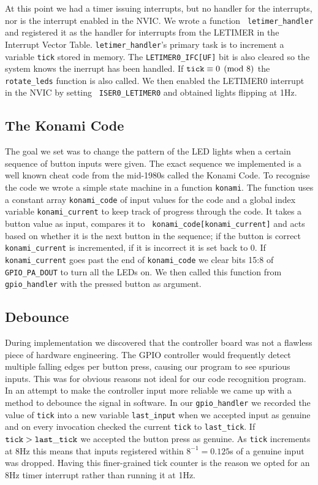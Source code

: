At this point we had a timer issuing interrupts, but no handler for the
interrupts, nor is the interrupt enabled in the NVIC. We wrote a function {\tt
letimer\_handler} and registered it as the handler for interrupts from the
LETIMER in the Interrupt Vector Table. {\tt letimer\_handler}'s primary task is
to increment a variable {\tt tick} stored in memory. The {\tt LETIMER0\_IFC[UF]}
bit is also cleared so the system knows the inerrupt has been handled. If \(
{\tt tick} \equiv 0 \pmod 8 \) the {\tt rotate\_leds} function is also called.
We then enabled the LETIMER0 interrupt in the NVIC by setting {\tt
ISER0\_LETIMER0} and obtained lights flipping at 1Hz.

\subsection{The Konami Code}

The goal we set was to change the pattern of the LED lights when a certain
sequence of button inputs were given. The exact sequence we implemented is a
well known cheat code from the mid-1980s called the Konami Code. To recognise
the code we wrote a simple state machine in a function {\tt konami}. The
function uses a constant array {\tt konami\_code} of input values for the code
and a global index variable {\tt konami\_current} to keep track of progress
through the code. It takes a button value as input, compares it to {\tt
konami\_code[konami\_current]} and acts based on whether it is the next button
in the sequence; if the button is correct {\tt konami\_current} is incremented,
if it is incorrect it is set back to 0. If {\tt konami\_current} goes past the
end of {\tt konami\_code} we clear bits 15:8 of {\tt GPIO\_PA\_DOUT} to turn all
the LEDs on. We then called this function from {\tt gpio\_handler} with the
pressed button as argument.

\subsection{Debounce}

During implementation we discovered that the controller board was not a flawless
piece of hardware engineering. The GPIO controller would frequently detect
multiple falling edges per button press, causing our program to see spurious
inputs. This was for obvious reasons not ideal for our code recognition program.
In an attempt to make the controller input more reliable we came up with a
method to debounce the signal in software. In our {\tt gpio\_handler} we
recorded the value of {\tt tick} into a new variable {\tt last\_input} when we
accepted input as genuine and on every invocation checked the current {\tt tick}
to {\tt last\_tick}. If \({\tt tick} > {\tt last\_tick}\) we accepted the button
press as genuine. As {\tt tick} increments at 8Hz this means that inputs
registered within \(8^{-1} = 0.125\)s of a genuine input was dropped. Having
this finer-grained tick counter is the reason we opted for an 8Hz timer
interrupt rather than running it at 1Hz.


